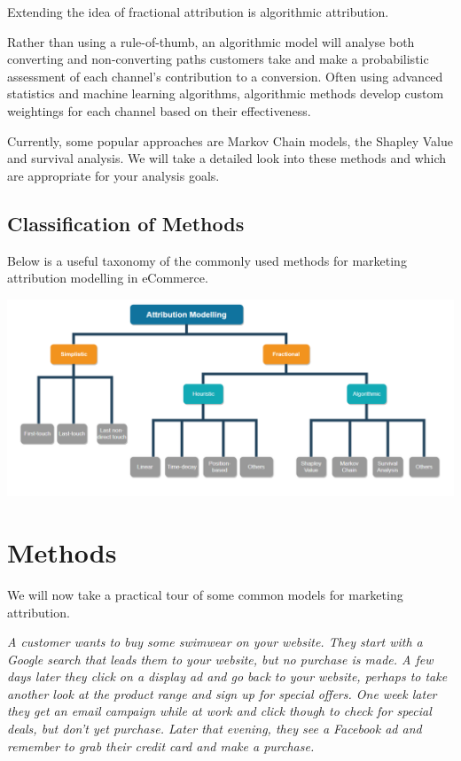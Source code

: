 \documentclass[]{book}
\begin{document}
Extending the idea of fractional attribution is algorithmic attribution.

Rather than using a rule-of-thumb, an algorithmic model will analyse
both converting and non-converting paths customers take and make a
probabilistic assessment of each channel's contribution to a conversion.
Often using advanced statistics and machine learning algorithms,
algorithmic methods develop custom weightings for each channel based on
their effectiveness.

Currently, some popular approaches are Markov Chain models, the Shapley
Value and survival analysis. We will take a detailed look into these
methods and which are appropriate for your analysis goals.

\section{Classification of Methods}\label{classification-of-methods}

Below is a useful taxonomy of the commonly used methods for marketing
attribution modelling in eCommerce.

\includegraphics[width=6.72in]{img/attributionModel}

\chapter{Methods}\label{methods}

We will now take a practical tour of some common models for marketing
attribution.

\emph{A customer wants to buy some swimwear on your website. They start
with a Google search that leads them to your website, but no purchase is
made. A few days later they click on a display ad and go back to your
website, perhaps to take another look at the product range and sign up
for special offers. One week later they get an email campaign while at
work and click though to check for special deals, but don't yet
purchase. Later that evening, they see a Facebook ad and remember to
grab their credit card and make a purchase.}
\end{document}
